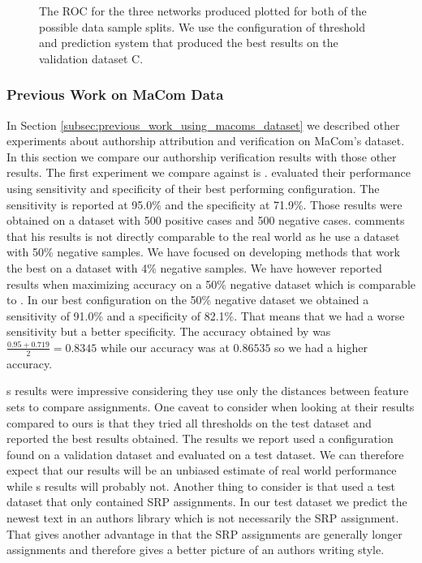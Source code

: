 \begin{figure}
\begin{minipage}{.5\textwidth}
    \end{minipage}
    \caption{The \gls{ROC} for the three networks produced plotted for both of
        the possible data sample splits. We use the configuration of threshold
        and prediction system that produced the best results on the validation
        dataset \gls{C}.}
    \label{fig:AUROC}
\end{figure}


\subsubsection{Previous Work on MaCom Data}

In Section \ref{subsec:previous_work_using_macoms_dataset} we described other
experiments about authorship attribution and verification on MaCom's dataset.
In this section we compare our authorship verification results with those
other results. The first experiment we compare against is \citep{aalykke2016}.
\citet{aalykke2016} evaluated their performance using sensitivity and
specificity of their best performing configuration. The sensitivity is reported
at 95.0\% and the specificity at 71.9\%. Those results were obtained on a
dataset with 500 positive cases and 500 negative cases. \citet{aalykke2016}
comments that his results is not directly comparable to the real world as he use
a dataset with 50\% negative samples. We have focused on developing methods that
work the best on a dataset with 4\% negative samples. We have however reported
results when maximizing accuracy on a 50\% negative dataset which is comparable
to \citep{aalykke2016}. In our best configuration on the 50\% negative dataset
we obtained a sensitivity of 91.0\% and a specificity of 82.1\%. That means that
we had a worse sensitivity but a better specificity. The accuracy obtained by
\citet{aalykke2016} was $\frac{0.95 + 0.719}{2} = 0.8345$ while our accuracy was
at $0.86535$ so we had a higher accuracy.

\citet{aalykke2016}s results were impressive considering they use only the
distances between feature sets to compare assignments. One caveat to consider
when looking at their results compared to ours is that they tried all thresholds
on the test dataset and reported the best results obtained. The results we
report used a configuration found on a validation dataset and evaluated on a
test dataset. We can therefore expect that our results will be an unbiased
estimate of real world performance while \citet{aalykke2016}s results will
probably not. Another thing to consider is that \citet{aalykke2016} used a
test dataset that only contained \gls{SRP} assignments. In our test dataset
we predict the newest text in an authors library which is not necessarily the
\gls{SRP} assignment. That gives \citet{aalykke2016} another advantage in that
the \gls{SRP} assignments are generally longer assignments and therefore gives a
better picture of an authors writing style.

